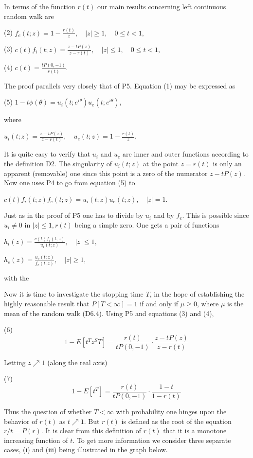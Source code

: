 In terms of the function $r(t)$ our main results concerning left continuous random walk are

(2) $f_e(t;z) = 1 - \frac{r(t)}{z}, \quad |z| \geq 1, \quad 0 \leq t < 1,$

(3) $c(t)f_i(t;z) = \frac{z - tP(z)}{z - r(t)}, \quad |z| \leq 1, \quad 0 \leq t < 1,$

(4) $c(t) = \frac{tP(0, -1)}{r(t)}$.

The proof parallels very closely that of P5. Equation (1) may be expressed as

(5) $1 - t\phi(\theta) = u_i(t;e^{i\theta})u_e(t;e^{i\theta}),$

where

$u_i(t;z) = \frac{z - tP(z)}{z - r(t)}, \quad u_e(t;z) = 1 - \frac{r(t)}{z}.$

It is quite easy to verify that $u_i$ and $u_e$ are inner and outer functions according to the definition D2. The singularity of $u_i(t;z)$ at the point $z = r(t)$ is only an apparent (removable) one since this point is a zero of the numerator $z - tP(z)$. Now one uses P4 to go from equation (5) to

$c(t)f_i(t;z)f_e(t;z) = u_i(t;z)u_e(t;z), \quad |z| = 1.$

Just as in the proof of P5 one has to divide by $u_i$ and by $f_e$. This is possible since $u_i \neq 0$ in $|z| \leq 1, r(t)$ being a simple zero. One gets a pair of functions

$h_i(z) = \frac{c(t)f_i(t;z)}{u_i(t;z)}, \quad |z| \leq 1,$

$h_e(z) = \frac{u_e(t;z)}{f_e(t;z)}, \quad |z| \geq 1,$

with the

Now it is time to investigate the stopping time $T$, in the hope of establishing the highly reasonable result that $P[T < \infty] = 1$ if and only if $\mu \geq 0$, where $\mu$ is the mean of the random walk (D6.4). Using P5 and equations (3) and (4),

(6) $$1 - E[t^T z^S T] = \frac{r(t)}{tP(0, -1)} \cdot \frac{z - tP(z)}{z - r(t)}$$

Letting $z \nearrow 1$ (along the real axis)

(7) $$1 - E[t^T] = \frac{r(t)}{tP(0, -1)} \cdot \frac{1 - t}{1 - r(t)}$$

Thus the question of whether $T < \infty$ with probability one hinges upon the behavior of $r(t)$ as $t \nearrow 1$. But $r(t)$ is defined as the root of the equation $r/t = P(r)$. It is clear from this definition of $r(t)$ that it is a monotone increasing function of $t$. To get more information we consider three separate cases, (i) and (iii) being illustrated in the graph below.

